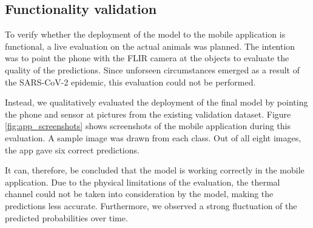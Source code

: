 \documentclass{l4proj}
\begin{document}
\subsection{Functionality validation}

To verify whether the deployment of the model to the mobile application is functional, a live evaluation on the actual animals was planned. The intention was to point the phone with the FLIR camera at the objects to evaluate the quality of the predictions. Since unforseen circumstances emerged as a result of the SARS-CoV-2 epidemic, this evaluation could not be performed.

Instead, we qualitatively evaluated the deployment of the final model by pointing the phone and sensor at pictures from the existing validation dataset. Figure \ref{fig:app_screenshots} shows screenshots of the mobile application during this evaluation. A sample image was drawn from each class. Out of all eight images, the app gave six correct predictions.

It can, therefore, be concluded that the model is working correctly in the mobile application. Due to the physical limitations of the evaluation, the thermal channel could not be taken into consideration by the model, making the predictions less accurate. Furthermore, we observed a strong fluctuation of the predicted probabilities over time.
\end{document}
